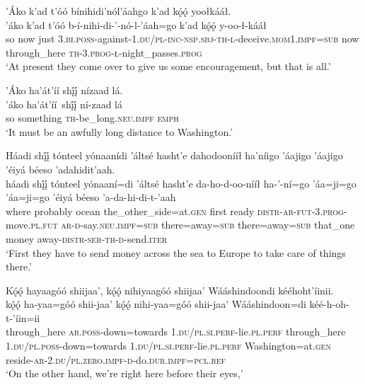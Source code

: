 \ea\label{ex:text7-17-6}
’Áko k’ad t’óó bínihidi’nól’áahgo k’ad kǫ́ǫ́ yoołkááł.\\
\gll ’áko	k’ad	t’óó	b-í-nihi-di-’-nó-l-’áah=go	k’ad	kǫ́ǫ́	y-oo-ł-kááł\\
     so	now	just	3.\textsc{bi}.\textsc{poss}-against-1.\textsc{du}/\textsc{pl}-\textsc{inc}-\textsc{nsp}.\textsc{sbj}-\textsc{th}-\textsc{l}-deceive.\textsc{mom}1.\textsc{impf}=\textsc{sub}	now	through\_here	\textsc{th}-3.\textsc{prog}-\textsc{ł}-night\_passes.\textsc{prog}\\
\glt `At present they come over to give us some encouragement, but that is all.'
\z

\ea\label{ex:text7-17-7}
’Áko ha’át’íí shį́į́ nízaad lá.\\
\gll ’áko	ha’át’íí~{shį́į́}	ní-zaad	lá\\
     so	something	\textsc{th}-be\_long.\textsc{neu}.\textsc{impf}	\textsc{emph}\\
\glt `It must be an awfully long distance to Washington.'
\z

\ea\label{ex:text7-17-8}
Háadi shį́į́ tónteel yónaanídi ’áltsé hasht’e dahodoonííł ha’níigo ’áajigo ’áajigo ’éiyá béeso ’adahidit’aah.\\
\gll háadi	shį́į́	tónteel	yónaaní=di	’áltsé	hasht’e	da-ho-d-oo-nííł	ha-’-ní=go	’áa=ji=go	’áa=ji=go	’éiyá	béeso	’a-da-hi-di-t-’aah\\
     where	probably	ocean	the\_other\_side=at.\textsc{gen}	first	ready	\textsc{distr}-\textsc{ar}-\textsc{fut}-3.\textsc{prog}-move.\textsc{pl}.\textsc{fut}	\textsc{ar}-\textsc{d}-say.\textsc{neu}.\textsc{impf}=\textsc{sub}	there=away=\textsc{sub}	there=away=\textsc{sub}	that\_one	money	away-\textsc{distr}-\textsc{ser}-\textsc{th}-\textsc{d}-send.\textsc{iter}\\
\glt `First they have to send money across the sea to Europe to take care of things there.'
\z

\ea\label{ex:text7-17-9}
Kǫ́ǫ́ hayaagóó shiijaa’, kǫ́ǫ́ nihiyaagóó shiijaa’ Wááshindoondi kééhoht’íinii.\\
\gll kǫ́ǫ́	ha-yaa=góó	shii-jaa’	kǫ́ǫ́	nihi-yaa=góó	shii-jaa’	Wááshindoon=di	kéé-h-oh-t-’íin=ii\\
     through\_here	\textsc{ar}.\textsc{poss}-down=towards	1.\textsc{du}/\textsc{pl}.\textsc{si}.\textsc{perf}-lie.\textsc{pl}.\textsc{perf}	through\_here	1.\textsc{du}/\textsc{pl}.\textsc{poss}-down=towards	1.\textsc{du}/\textsc{pl}.\textsc{si}.\textsc{perf}-lie.\textsc{pl}.\textsc{perf}	Washington=at.\textsc{gen}	reside-\textsc{ar}-2.\textsc{du}/\textsc{pl}.\textsc{zero}.\textsc{impf}-\textsc{d}-do.\textsc{dur}.\textsc{impf}=\textsc{pcl}.\textsc{ref}\\
\glt `On the other hand, we're right here before their eyes,'
\z

